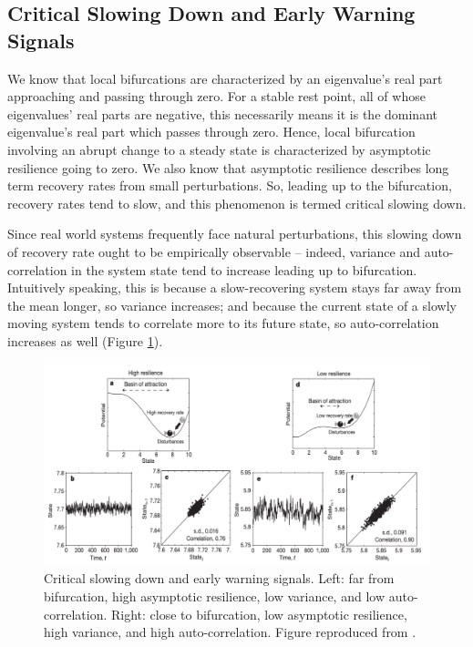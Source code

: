 %


\subsection{Critical Slowing Down and Early Warning Signals}

We know that local bifurcations are characterized by an eigenvalue's real part approaching and passing through zero. For a stable rest point, all of whose eigenvalues' real parts are negative, this necessarily means it is the dominant eigenvalue's real part which passes through zero. Hence, local bifurcation involving an abrupt change to a steady state is characterized by asymptotic resilience going to zero. We also know that asymptotic resilience describes long term recovery rates from small perturbations. So, leading up to the bifurcation, recovery rates tend to slow, and this phenomenon is termed critical slowing down. 

Since real world systems frequently face natural perturbations, this slowing down of recovery rate ought to be empirically observable -- indeed, variance and auto-correlation in the system state tend to increase leading up to bifurcation. Intuitively speaking, this is because a slow-recovering system stays far away from the mean longer, so variance increases; and because the current state of a slowly moving system tends to correlate more to its future state, so auto-correlation increases as well (Figure \ref{fig:csd}).

\begin{figure}[]
	\centering
	\captionsetup{width=0.9\linewidth}
	\includegraphics[width=\textwidth]{figs/critical_slowing_down}
	\caption{Critical slowing down and early warning signals. Left: far from bifurcation, high asymptotic resilience, low variance, and low auto-correlation. Right: close to bifurcation, low asymptotic resilience, high variance, and high auto-correlation. Figure reproduced from \cite{schefferEarlywarningSignalsCritical2009}.}
	
	\label{fig:csd}
\end{figure} 

